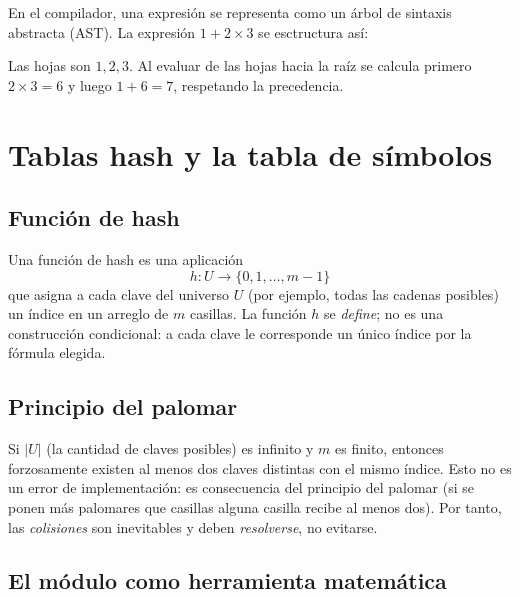 \documentclass[10pt,a4paper]{article}
\theoremstyle{definition}
\begin{document}
En el compilador, una expresión se representa como un árbol de sintaxis abstracta (AST).
La expresión $1 + 2 \times 3$ se esctructura así:

\begin{center}
    \shorthandoff{<>}
    \shorthandon{<>}
\end{center}

Las hojas son $1, 2, 3$. Al evaluar de las hojas hacia la raíz se
calcula primero $2 \times 3 = 6$ y luego $1 + 6 = 7$, respetando la precedencia.

\section{Tablas hash y la tabla de símbolos}

\subsection{Función de hash}

Una función de hash es una aplicación
\[
    h : U \longrightarrow \{0,1,\dots,m-1\}
\]
que asigna a cada clave del universo $U$ (por ejemplo, todas las cadenas posibles) un índice
en un arreglo de $m$ casillas. La función $h$ se \emph{define}; no es una construcción condicional:
a cada clave le corresponde un único índice por la fórmula elegida.

\subsection{Principio del palomar}

Si $|U|$ (la cantidad de claves posibles) es infinito y $m$ es finito,
entonces forzosamente existen al menos dos claves distintas con el mismo
índice. Esto no es un error de implementación: es consecuencia del principio del palomar
(si se ponen más palomares que casillas alguna casilla recibe al menos dos). Por tanto,
las \emph{colisiones} son inevitables y deben \emph{resolverse}, no evitarse.

\subsection{El módulo como herramienta matemática}
\end{document}
